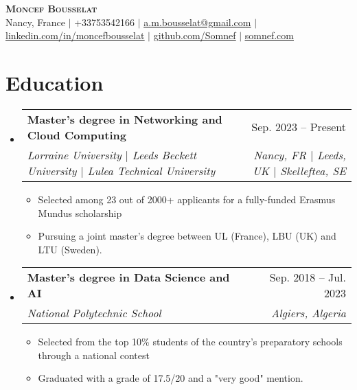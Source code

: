 \documentclass[letterpaper,10.5t]{article}
\makeatletter
\newcommand{\resumeItem}[1]{
  \item\small{
    {#1 \vspace{-2pt}}
  }
}
\newcommand{\resumeSubheading}[4]{
  \vspace{-2pt}\item
    \begin{tabular*}{0.97\textwidth}[t]{l@{\extracolsep{\fill}}r}
      \textbf{#1} & #2 \\
      \textit{\small#3} & \textit{\small #4} \\
    \end{tabular*}\vspace{-7pt}
}
\newcommand{\resumeSubHeadingListStart}{\begin{itemize}[leftmargin=0.15in, label={}]}
\newcommand{\resumeSubHeadingListEnd}{\end{itemize}}
\newcommand{\resumeItemListStart}{\begin{itemize}}
\newcommand{\resumeItemListEnd}{\end{itemize}\vspace{-5pt}}
\makeatother
\begin{document}

\begin{center}
    \textbf{\Huge \scshape Moncef Bousselat} \\ \vspace{1pt}
    \small Nancy, France $|$ 
    \small +33753542166 $|$ 
    \href{mailto:a.m.bousselat@gmail.com@gmail.com}{\underline{a.m.bousselat@gmail.com}} $|$ 
    \href{https://www.linkedin.com/in/moncefbousselat/}{\underline{linkedin.com/in/moncefbousselat}} $|$
    \href{https://github.com/Somnef}{\underline{github.com/Somnef}} $|$
    \href{https://www.somnef.com}{\underline{somnef.com}}
\end{center}


\section{Education}
    \resumeSubHeadingListStart
        \resumeSubheading
        {Master's degree in Networking and Cloud Computing}{Sep. 2023 -- Present}
        {Lorraine University $|$ Leeds Beckett University $|$ Lulea Technical University}{Nancy, FR $|$ Leeds, UK $|$ Skelleftea, SE}
            \resumeItemListStart
                \resumeItem{Selected among 23 out of 2000+ applicants for a fully-funded Erasmus Mundus scholarship}
                \resumeItem{Pursuing a joint master's degree between UL (France), LBU (UK) and LTU (Sweden).}
            \resumeItemListEnd
      
        \resumeSubheading
        {Master's degree in Data Science and AI}{Sep. 2018 -- Jul. 2023}
        {National Polytechnic School}{Algiers, Algeria}
            \resumeItemListStart
                \resumeItem{Selected from the top 10\% students of the country's preparatory schools through a national contest}
                \resumeItem{Graduated with a grade of 17.5/20 and a "very good" mention.}
            \resumeItemListEnd
  \resumeSubHeadingListEnd
\end{document}
